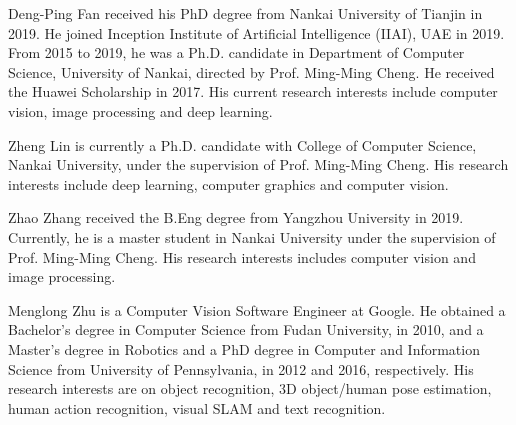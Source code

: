 \documentclass[journal]{IEEEtran}
\begin{document}
\ifCLASSOPTIONcaptionsoff
  \newpage
\fi



{\small


}



\vspace{-.3in}
\begin{IEEEbiography}
{Deng-Ping Fan} received his PhD degree from Nankai University of Tianjin in 2019.
He joined Inception Institute of Artificial Intelligence (IIAI), UAE in 2019.
From 2015 to 2019, he was a Ph.D. candidate in Department of Computer Science, University
of Nankai, directed by Prof. Ming-Ming Cheng. He received the Huawei Scholarship in 2017.
His current research interests include computer vision, image processing and deep learning.
\end{IEEEbiography}
\vspace{-.3in}

\begin{IEEEbiography}
{Zheng Lin} is currently a Ph.D. candidate with
College of Computer Science, Nankai University, under the supervision of
Prof. Ming-Ming Cheng. His research interests include deep learning,
computer graphics and computer vision.
\end{IEEEbiography}
\vspace{-.3in}


\begin{IEEEbiography}
{Zhao Zhang} received the B.Eng degree from Yangzhou University in 2019.
Currently, he is a master student in Nankai University under the
supervision of Prof. Ming-Ming Cheng. His research interests
includes computer vision and image processing.
\end{IEEEbiography}
\vspace{-.3in}

\begin{IEEEbiography}
{Menglong Zhu} is a Computer Vision Software
Engineer at Google. He obtained a Bachelor’s
degree in Computer Science from Fudan University, in 2010, and a Master’s degree in Robotics
and a PhD degree in Computer and Information Science from University of Pennsylvania, in
2012 and 2016, respectively. His research interests are on object recognition, 3D object/human
pose estimation, human action recognition, visual SLAM and text recognition.
\end{IEEEbiography}
\vspace{-.3in}
\end{document}
